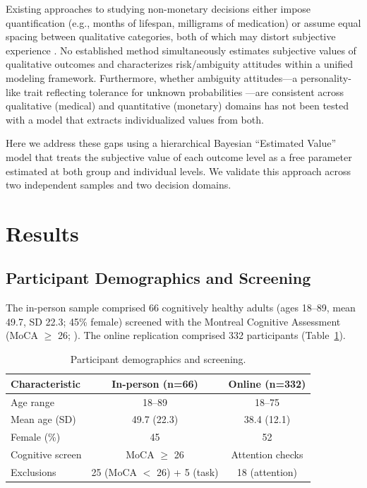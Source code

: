 \documentclass[11pt]{article}
\begin{document}
Existing approaches to studying non-monetary decisions either impose quantification (e.g., months of lifespan, milligrams of medication) or assume equal spacing between qualitative categories, both of which may distort subjective experience \citep{busemeyer2002survey}. No established method simultaneously estimates subjective values of qualitative outcomes and characterizes risk/ambiguity attitudes within a unified modeling framework. Furthermore, whether ambiguity attitudes---a personality-like trait reflecting tolerance for unknown probabilities \citep{hsu2005neural, tymula2012ambiguity}---are consistent across qualitative (medical) and quantitative (monetary) domains has not been tested with a model that extracts individualized values from both.

Here we address these gaps using a hierarchical Bayesian ``Estimated Value'' model \citep{gelman2013bayesian} that treats the subjective value of each outcome level as a free parameter estimated at both group and individual levels. We validate this approach across two independent samples and two decision domains.

\section{Results}

\subsection{Participant Demographics and Screening}

The in-person sample comprised 66 cognitively healthy adults (ages 18--89, mean 49.7, SD 22.3; 45\% female) screened with the Montreal Cognitive Assessment (MoCA $\geq$ 26; \citealt{nasreddine2005moca}). The online replication comprised 332 participants (Table~\ref{tab:demographics}).

\begin{table}[H]
\centering
\caption{Participant demographics and screening.}
\label{tab:demographics}
\begin{tabular}{lcc}
\toprule
\textbf{Characteristic} & \textbf{In-person (n=66)} & \textbf{Online (n=332)} \\
\midrule
Age range & 18--89 & 18--75 \\
Mean age (SD) & 49.7 (22.3) & 38.4 (12.1) \\
Female (\%) & 45 & 52 \\
Cognitive screen & MoCA $\geq$ 26 & Attention checks \\
Exclusions & 25 (MoCA $<$ 26) + 5 (task) & 18 (attention) \\
\bottomrule
\end{tabular}
\end{table}
\end{document}
